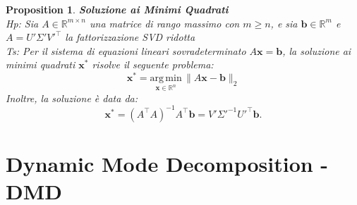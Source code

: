 \documentclass[serif]{beamer}
\newtheorem{proposition}{Proposition}
\begin{document}
\begin{frame}
\begin{proposition}
\textbf{Soluzione ai Minimi Quadrati}\\
\textit{Hp:} Sia $A \in \mathbb{R}^{m \times n}$ una matrice di rango massimo con $m \geq n$, e sia $\mathbf{b} \in \mathbb{R}^m$ e \( A= U' \Sigma' V'^\top \) la fattorizzazione SVD ridotta\\
\textit{Ts:} Per il sistema di equazioni lineari sovradeterminato $A\mathbf{x} = \mathbf{b}$, la soluzione ai minimi quadrati $\mathbf{x}^*$ risolve il seguente problema:
\[
\mathbf{x^*} = \underset{\mathbf{x} \in \mathbb{R}^n}{\mathrm{arg\,min}} \, \| A\mathbf{x} - \mathbf{b} \|_2
\]
Inoltre, la soluzione è data da:
\[
\mathbf{x}^* = (A^\top A)^{-1}A^\top \mathbf{b} = V' \Sigma'^{-1} U'^\top \mathbf{b}.
\]
\end{proposition}
\end{frame}

\section{Dynamic Mode Decomposition - DMD}
\end{document}
